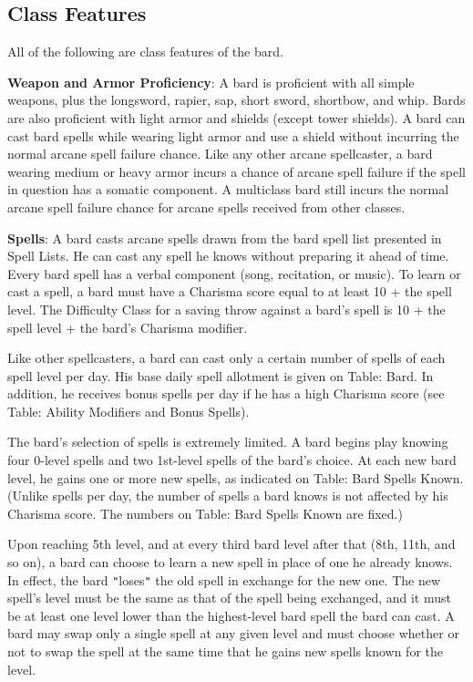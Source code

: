 \subsection{Class Features}

				
All of the following are class features of the bard.
				
\textbf{Weapon and Armor Proficiency}: A bard is proficient with all simple weapons, plus the longsword, rapier, sap, short sword, shortbow, and whip. Bards are also proficient with light armor and shields (except tower shields). A bard can cast bard spells while wearing light armor and use a shield without incurring the normal arcane spell failure chance. Like any other arcane spellcaster, a bard wearing medium or heavy armor incurs a chance of arcane spell failure if the spell in question has a somatic component. A multiclass bard still incurs the normal arcane spell failure chance for arcane spells received from other classes.
				
\textbf{Spells}: A bard casts arcane spells drawn from the bard spell list presented in Spell Lists. He can cast any spell he knows without preparing it ahead of time. Every bard spell has a verbal component (song, recitation, or music). To learn or cast a spell, a bard must have a Charisma score equal to at least 10 + the spell level. The Difficulty Class for a saving throw against a bard's spell is 10 + the spell level + the bard's Charisma modifier.
				
Like other spellcasters, a bard can cast only a certain number of spells of each spell level per day. His base daily spell allotment is given on Table: Bard. In addition, he receives bonus spells per day if he has a high Charisma score (see Table: Ability Modifiers and Bonus Spells).
				
The bard's selection of spells is extremely limited. A bard begins play knowing four 0-level spells and two 1st-level spells of the bard's choice. At each new bard level, he gains one or more new spells, as indicated on Table: Bard Spells Known. (Unlike spells per day, the number of spells a bard knows is not affected by his Charisma score. The numbers on Table: Bard Spells Known are fixed.)
				
Upon reaching 5th level, and at every third bard level after that (8th, 11th, and so on), a bard can choose to learn a new spell in place of one he already knows. In effect, the bard \texttt{{}"{}}loses\texttt{{}"{}} the old spell in exchange for the new one. The new spell's level must be the same as that of the spell being exchanged, and it must be at least one level lower than the highest-level bard spell the bard can cast. A bard may swap only a single spell at any given level and must choose whether or not to swap the spell at the same time that he gains new spells known for the level.
				
